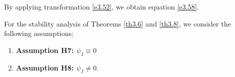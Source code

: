 \documentclass[10pt, a4paper]{amsart}
\makeatletter
\newcounter{assu}
\theoremstyle{plain}
\theoremstyle{definition}
\theoremstyle{remark}
\renewenvironment{proof}[1][\proofname]{\par
  \pushQED{\qed}%
  \normalfont \topsep6\p@\@plus6\p@\relax
  \trivlist
  \item[\hskip\labelsep
        \itshape
    #1\ \ref{#1}.]\ignorespaces
}{%
  \popQED\endtrivlist\@endpefalse
}
\numberwithin{equation}{section}
\makeatother
\begin{document}
\begin{proof}[of Lemma \ref{le3.4}]
 By applying transformation \eqref{e3.52}, we obtain equation \eqref{e3.58}.


\end{proof}
 
 For the stability analysis of Theorems \ref{th3.6} and \ref{th3.8}, we consider the following assumptions:
 \begin{enumerate}
     \item[]  {\bf Assumption H7:  $\psi_I\equiv 0$}
     \item[]  {\bf Assumption H8:  $\psi_I\neq 0.$}
 \end{enumerate}
\end{document}
